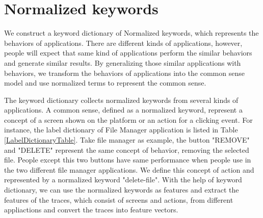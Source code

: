 \clearpage

\section{Normalized keywords}

We construct a keyword dictionary of Normalized keywords, which represents the behaviors of applications.
There are different kinds of applications, however,
people will expect that same kind of applications perform the similar behaviors and generate similar results.
By generalizing those similar applications with behaviors,
we transform the behaviors of applications into the common sense model and use normalized terms to represent the common sense.

The keyword dictionary collects normalized keywords from several kinds of applications.
A common sense, defined as a normalized keyword, represent a concept of a screen shown on the platform or an action for a clicking event.
For instance, the label dictionary of File Manager application is listed in Table \ref{LabelDictionaryTable}.
Take file manager as example, the button "REMOVE" and "DELETE" represent the same concept of behavior, removing the selected file.
People except this two buttons have same performance when people use in the two different file manager applications.
We define this concept of action and represented by a normalized keyword "delete-file".
With the help of keyword dictionary,
we can use the normalized keywords as features and extract the features of the traces, 
which consist of screens and actions, from different appliactions and convert the traces into feature vectors.


